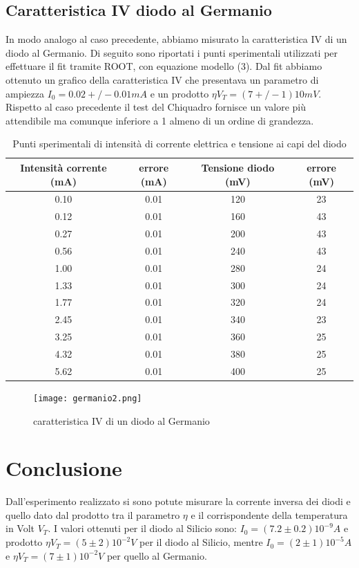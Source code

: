 \documentclass{article}
\begin{document}
\subsection{Caratteristica IV diodo al Germanio}
In modo analogo al caso precedente, abbiamo misurato la caratteristica IV di un diodo al Germanio. Di seguito sono riportati i punti sperimentali utilizzati per effettuare il fit tramite ROOT, con equazione modello (3). Dal fit abbiamo ottenuto un grafico della caratteristica IV che presentava un parametro di ampiezza \(I_0 =0.02+/-0.01 mA\) e un prodotto \(\eta V_T=(7+/-1)10mV\). Rispetto al caso precedente il test del Chiquadro fornisce un valore più attendibile ma comunque inferiore a 1 almeno di un ordine di grandezza.
\begin{table}[]
    \centering
    \begin{tabular}{||c|c|c|c||}
    \hline
    Intensità corrente (mA) & errore (mA) & Tensione diodo (mV) & errore (mV) \\
    \hline\hline
    0.10 & 0.01 & 120 & 23 \\
    0.12 & 0.01 & 160 & 43 \\
    0.27 & 0.01 & 200 & 43 \\
    0.56 & 0.01 & 240 & 43 \\
    1.00 & 0.01 & 280 & 24 \\
    1.33 & 0.01 & 300 & 24 \\
    1.77 & 0.01 & 320 & 24 \\
    2.45 & 0.01 & 340 & 23 \\
    3.25 & 0.01 & 360 & 25 \\
    4.32 & 0.01 & 380 & 25 \\
    5.62 & 0.01 & 400 & 25 \\
    \hline
    \end{tabular}
    \caption{Punti sperimentali di intensità di corrente elettrica e tensione ai capi del diodo}
    \label{tab:my_label}
\end{table}
\quad
\begin{figure}
    \centering
    \texttt{[image: germanio2.png]}
    \caption{caratteristica IV di un diodo al Germanio}
    \label{fig:my_label}
\end{figure}
\section{Conclusione}
Dall’esperimento realizzato si sono potute misurare la corrente inversa dei diodi e quello dato dal prodotto tra il parametro  \(\eta\) e il corrispondente della temperatura in Volt \(V_T\). I valori ottenuti per il diodo al Silicio sono: \(I_0=(7.2 \pm 0.2)10^{-9}A\) e prodotto \(\eta V_T =(5 \pm 2)10^{-2}V\) per il diodo al Silicio, mentre \(I_0=(2\pm1)10^{-5}A\) e \(\eta V_T=(7 \pm 1)10^{-2}V\) per quello al Germanio. 
\end{document}
